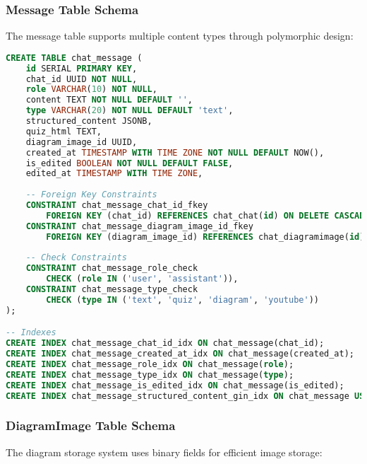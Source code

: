 \documentclass[12pt,a4paper]{article}
\begin{document}
\subsubsection{Message Table Schema}

The message table supports multiple content types through polymorphic design:

\begin{lstlisting}[language=SQL, caption=Message Table Structure]
CREATE TABLE chat_message (
    id SERIAL PRIMARY KEY,
    chat_id UUID NOT NULL,
    role VARCHAR(10) NOT NULL,
    content TEXT NOT NULL DEFAULT '',
    type VARCHAR(20) NOT NULL DEFAULT 'text',
    structured_content JSONB,
    quiz_html TEXT,
    diagram_image_id UUID,
    created_at TIMESTAMP WITH TIME ZONE NOT NULL DEFAULT NOW(),
    is_edited BOOLEAN NOT NULL DEFAULT FALSE,
    edited_at TIMESTAMP WITH TIME ZONE,
    
    -- Foreign Key Constraints
    CONSTRAINT chat_message_chat_id_fkey 
        FOREIGN KEY (chat_id) REFERENCES chat_chat(id) ON DELETE CASCADE,
    CONSTRAINT chat_message_diagram_image_id_fkey 
        FOREIGN KEY (diagram_image_id) REFERENCES chat_diagramimage(id) ON DELETE SET NULL,
    
    -- Check Constraints
    CONSTRAINT chat_message_role_check 
        CHECK (role IN ('user', 'assistant')),
    CONSTRAINT chat_message_type_check 
        CHECK (type IN ('text', 'quiz', 'diagram', 'youtube'))
);

-- Indexes
CREATE INDEX chat_message_chat_id_idx ON chat_message(chat_id);
CREATE INDEX chat_message_created_at_idx ON chat_message(created_at);
CREATE INDEX chat_message_role_idx ON chat_message(role);
CREATE INDEX chat_message_type_idx ON chat_message(type);
CREATE INDEX chat_message_is_edited_idx ON chat_message(is_edited);
CREATE INDEX chat_message_structured_content_gin_idx ON chat_message USING GIN(structured_content);
\end{lstlisting}

\subsubsection{DiagramImage Table Schema}

The diagram storage system uses binary fields for efficient image storage:
\end{document}
